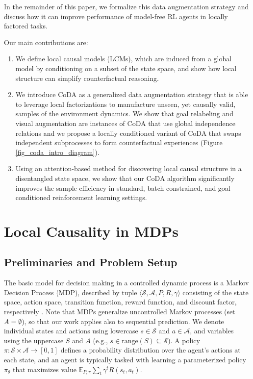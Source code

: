 \documentclass{article}
\renewcommand{\S}{\mathcal{S}}
\newcommand{\A}{\mathcal{A}}
\begin{document}
In the remainder of this paper, we formalize this data augmentation strategy and discuss how it can improve performance of model-free RL agents in locally factored tasks. 

Our main contributions are:
%
\begin{enumerate}[leftmargin=*]
%
\item We define local causal models (LCMs), which are induced from a global model by conditioning on a subset of the state space, and show how local structure can simplify counterfactual reasoning.
%
\item We introduce CoDA as a generalized data augmentation strategy that is able to leverage local factorizations to manufacture unseen, yet causally valid, samples of the environment dynamics.
We show that goal relabeling \cite{kaelbling1993learning,andrychowicz2017hindsight} and visual augmentation \cite{andrychowicz2020learning,laskin2020reinforcement} are instances of CoDA that use global independence relations
and we propose a locally conditioned variant of CoDA that swaps independent subprocesses to form counterfactual experiences (Figure \ref{fig_coda_intro_diagram}).
%
\item Using an attention-based method for discovering local causal structure in a disentangled state space, we show that our CoDA algorithm significantly improves the sample efficiency in standard, batch-constrained, and goal-conditioned reinforcement learning settings. 
%
\end{enumerate}

\section{
Local Causality in MDPs
}\label{section_locally_factored}


\subsection{Preliminaries and Problem Setup} \label{subsection_prelim}
The basic model for decision making in a controlled dynamic process is a Markov Decision Process (MDP), described by tuple $\langle \S, \A, P, R, \gamma \rangle$ consisting of the state space, action space, transition function, reward function, and discount factor, respectively \cite{puterman2014markov,sutton2018reinforcement}. Note that MDPs generalize uncontrolled Markov processes (set $A = \emptyset$), so that our work applies also to sequential prediction. 
%
We denote individual states and actions using lowercase $s \in \S$ and $a \in \A$, and variables using the uppercase $S$ and $A$ (e.g., $s \in \textrm{range}(S) \subseteq \S$). 
%
A policy $\pi : \S \times \A \to [0, 1]$ defines a probability distribution over the agent's actions at each state, and an agent is typically tasked with learning a parameterized policy $\pi_\theta$ that maximizes value $\mathbb{E}_{P,\pi}\sum_t\gamma^tR(s_t, a_t)$. 
\end{document}
